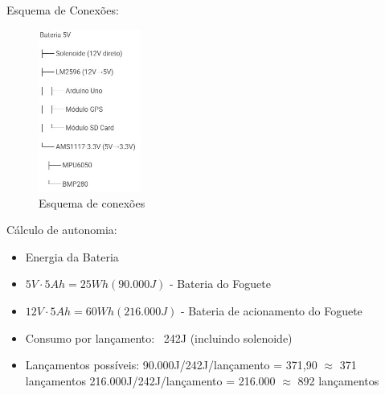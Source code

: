 
 \noindent Esquema de Conexões:

 \begin{figure}[H]
     \centering
     \includegraphics[width=0.3\textwidth]{figuras/Esquema.jpg}    
     \caption{Esquema de conexões}
     \label{fig:tabela}
 \end{figure}


 \noindent Cálculo de autonomia:
 \begin{itemize}
     \item Energia da Bateria
     \item $5V \cdot5Ah = 25 Wh (90.000J)$ - Bateria do Foguete
     \item $12V \cdot5Ah = 60 Wh (216.000J)$ - Bateria de acionamento do Foguete
     \item Consumo por lançamento: ~242J (incluindo solenoide)
     \item Lançamentos possíveis:
     \subsubitem 90.000J/242J/lançamento = 371,90 $\approx$ 371 lançamentos
     \subsubitem 216.000J/242J/lançamento = 216.000 $\approx$ 892 lançamentos
 \end{itemize}
 


